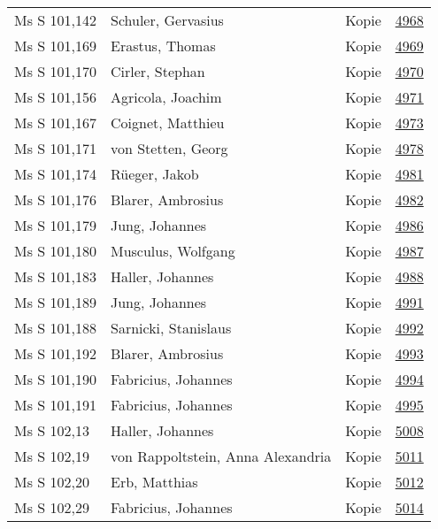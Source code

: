 \documentclass[10pt,a4paper,landscape]{report}
\begin{document}
\begin{longtable}{p{16cm}p{4cm}lr}
Ms S 101,142	&	Schuler, Gervasius	&	Kopie	&	\href{http://130.60.24.72/assignment/4968}{4968}\\
Ms S 101,169	&	Erastus, Thomas	&	Kopie	&	\href{http://130.60.24.72/assignment/4969}{4969}\\
Ms S 101,170	&	Cirler, Stephan	&	Kopie	&	\href{http://130.60.24.72/assignment/4970}{4970}\\
Ms S 101,156	&	Agricola, Joachim	&	Kopie	&	\href{http://130.60.24.72/assignment/4971}{4971}\\
Ms S 101,167	&	Coignet, Matthieu	&	Kopie	&	\href{http://130.60.24.72/assignment/4973}{4973}\\
Ms S 101,171	&	von Stetten, Georg	&	Kopie	&	\href{http://130.60.24.72/assignment/4978}{4978}\\
Ms S 101,174	&	Rüeger, Jakob	&	Kopie	&	\href{http://130.60.24.72/assignment/4981}{4981}\\
Ms S 101,176	&	Blarer, Ambrosius	&	Kopie	&	\href{http://130.60.24.72/assignment/4982}{4982}\\
Ms S 101,179	&	Jung, Johannes	&	Kopie	&	\href{http://130.60.24.72/assignment/4986}{4986}\\
Ms S 101,180	&	Musculus, Wolfgang	&	Kopie	&	\href{http://130.60.24.72/assignment/4987}{4987}\\
Ms S 101,183	&	Haller, Johannes	&	Kopie	&	\href{http://130.60.24.72/assignment/4988}{4988}\\
Ms S 101,189	&	Jung, Johannes	&	Kopie	&	\href{http://130.60.24.72/assignment/4991}{4991}\\
Ms S 101,188	&	Sarnicki, Stanislaus	&	Kopie	&	\href{http://130.60.24.72/assignment/4992}{4992}\\
Ms S 101,192	&	Blarer, Ambrosius	&	Kopie	&	\href{http://130.60.24.72/assignment/4993}{4993}\\
Ms S 101,190	&	Fabricius, Johannes	&	Kopie	&	\href{http://130.60.24.72/assignment/4994}{4994}\\
Ms S 101,191	&	Fabricius, Johannes	&	Kopie	&	\href{http://130.60.24.72/assignment/4995}{4995}\\
Ms S 102,13	&	Haller, Johannes	&	Kopie	&	\href{http://130.60.24.72/assignment/5008}{5008}\\
Ms S 102,19	&	von Rappoltstein, Anna Alexandria	&	Kopie	&	\href{http://130.60.24.72/assignment/5011}{5011}\\
Ms S 102,20	&	Erb, Matthias	&	Kopie	&	\href{http://130.60.24.72/assignment/5012}{5012}\\
Ms S 102,29	&	Fabricius, Johannes	&	Kopie	&	\href{http://130.60.24.72/assignment/5014}{5014}\\

\end{longtable}
\end{document}
